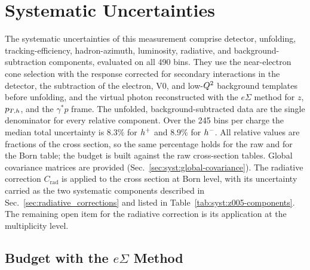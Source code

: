 \section{Systematic Uncertainties}
\label{sec:systematics}

The systematic uncertainties of this measurement comprise detector, unfolding,
tracking-efficiency, hadron-azimuth, luminosity, radiative, and
background-subtraction components, evaluated on all 490 bins.  They use the
near-electron cone selection with the response corrected for secondary
interactions in the detector, the subtraction of the electron, V0, and
low-$Q^{2}$ background templates before unfolding, and the virtual photon
reconstructed with the $e\Sigma$ method for $z$, $p_{T,h}$, and the $\gamma^{*}p$
frame.  The unfolded, background-subtracted data are the single denominator
for every relative component.  Over the 245 bins per charge the median total
uncertainty is $8.3\%$ for $h^{+}$ and $8.9\%$ for $h^{-}$.  All relative values are fractions of the
cross section, so the same percentage holds for the raw and for the Born
table; the budget is built against the raw cross-section tables.  Global covariance
matrices are provided (Sec.~\ref{sec:syst:global-covariance}).  The radiative correction
$C_{\mathrm{rad}}$ is applied to the cross section at Born level, with its
uncertainty carried as the two systematic components described in
Sec.~\ref{sec:radiative_corrections} and listed in
Table~\ref{tab:syst:z005-components}.  The remaining open item for the
radiative correction is its application at the multiplicity level.

\subsection{Budget with the $e\Sigma$ Method}
\label{sec:syst:budget-regeneration}

